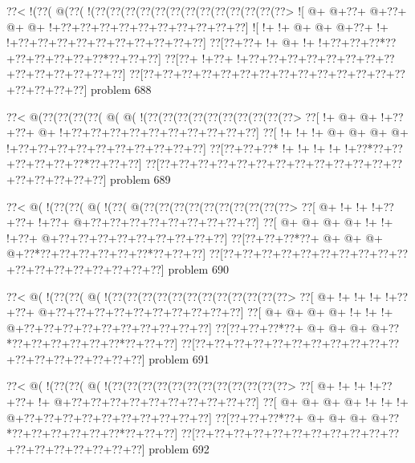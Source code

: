 \vbox{\vbox{\goo
\0??<\- !(\0??(\- @(\0??(\- !(\0??(\0??(\0??(\0??(\0??(\0??(\0??(\0??(\0??(\0??(\0??(\0??(\0??>
\- ![\- @+\- @+\0??+\- @+\0??+\- @+\- @+\- !+\0??+\0??+\0??+\0??+\0??+\0??+\0??+\0??+\0??+\0??]
\- ![\- !+\- !+\- @+\- @+\- @+\0??+\- !+\- !+\0??+\0??+\0??+\0??+\0??+\0??+\0??+\0??+\0??+\0??]
\0??[\0??+\0??+\- !+\- @+\- !+\- !+\0??+\0??+\0??*\0??+\0??+\0??+\0??+\0??+\0??*\0??+\0??+\0??]
\0??[\0??+\- !+\0??+\- !+\0??+\0??+\0??+\0??+\0??+\0??+\0??+\0??+\0??+\0??+\0??+\0??+\0??+\0??]
\0??[\0??+\0??+\0??+\0??+\0??+\0??+\0??+\0??+\0??+\0??+\0??+\0??+\0??+\0??+\0??+\0??+\0??+\0??]
}
\hfil problem 688\hfil\break
}



\vbox{\vbox{\goo
\0??<\- @(\0??(\0??(\0??(\0??(\- @(\- @(\- !(\0??(\0??(\0??(\0??(\0??(\0??(\0??(\0??(\0??(\0??>
\0??[\- !+\- @+\- @+\- !+\0??+\0??+\- @+\- !+\0??+\0??+\0??+\0??+\0??+\0??+\0??+\0??+\0??+\0??]
\0??[\- !+\- !+\- !+\- @+\- @+\- @+\- @+\- !+\0??+\0??+\0??+\0??+\0??+\0??+\0??+\0??+\0??+\0??]
\0??[\0??+\0??+\0??*\- !+\- !+\- !+\- !+\- !+\0??*\0??+\0??+\0??+\0??+\0??+\0??*\0??+\0??+\0??]
\0??[\0??+\0??+\0??+\0??+\0??+\0??+\0??+\0??+\0??+\0??+\0??+\0??+\0??+\0??+\0??+\0??+\0??+\0??]
}
\hfil problem 689\hfil\break
}



\vbox{\vbox{\goo
\0??<\- @(\- !(\0??(\0??(\- @(\- !(\0??(\- @(\0??(\0??(\0??(\0??(\0??(\0??(\0??(\0??(\0??(\0??>
\0??[\- @+\- !+\- !+\- !+\0??+\0??+\- !+\0??+\- @+\0??+\0??+\0??+\0??+\0??+\0??+\0??+\0??+\0??]
\0??[\- @+\- @+\- @+\- @+\- !+\- !+\- !+\0??+\- @+\0??+\0??+\0??+\0??+\0??+\0??+\0??+\0??+\0??]
\0??[\0??+\0??+\0??*\0??+\- @+\- @+\- @+\- @+\0??*\0??+\0??+\0??+\0??+\0??+\0??*\0??+\0??+\0??]
\0??[\0??+\0??+\0??+\0??+\0??+\0??+\0??+\0??+\0??+\0??+\0??+\0??+\0??+\0??+\0??+\0??+\0??+\0??]
}
\hfil problem 690\hfil\break
}



\vbox{\vbox{\goo
\0??<\- @(\- !(\0??(\0??(\- @(\- !(\0??(\0??(\0??(\0??(\0??(\0??(\0??(\0??(\0??(\0??(\0??(\0??>
\0??[\- @+\- !+\- !+\- !+\- !+\0??+\0??+\- @+\0??+\0??+\0??+\0??+\0??+\0??+\0??+\0??+\0??+\0??]
\0??[\- @+\- @+\- @+\- @+\- !+\- !+\- !+\- @+\0??+\0??+\0??+\0??+\0??+\0??+\0??+\0??+\0??+\0??]
\0??[\0??+\0??+\0??*\0??+\- @+\- @+\- @+\- @+\0??*\0??+\0??+\0??+\0??+\0??+\0??*\0??+\0??+\0??]
\0??[\0??+\0??+\0??+\0??+\0??+\0??+\0??+\0??+\0??+\0??+\0??+\0??+\0??+\0??+\0??+\0??+\0??+\0??]
}
\hfil problem 691\hfil\break
}



\vbox{\vbox{\goo
\0??<\- @(\- !(\0??(\0??(\- @(\- !(\0??(\0??(\0??(\0??(\0??(\0??(\0??(\0??(\0??(\0??(\0??(\0??>
\0??[\- @+\- !+\- !+\- !+\0??+\0??+\- !+\- @+\0??+\0??+\0??+\0??+\0??+\0??+\0??+\0??+\0??+\0??]
\0??[\- @+\- @+\- @+\- @+\- !+\- !+\- !+\- @+\0??+\0??+\0??+\0??+\0??+\0??+\0??+\0??+\0??+\0??]
\0??[\0??+\0??+\0??*\0??+\- @+\- @+\- @+\- @+\0??*\0??+\0??+\0??+\0??+\0??+\0??*\0??+\0??+\0??]
\0??[\0??+\0??+\0??+\0??+\0??+\0??+\0??+\0??+\0??+\0??+\0??+\0??+\0??+\0??+\0??+\0??+\0??+\0??]
}
\hfil problem 692\hfil\break
}



